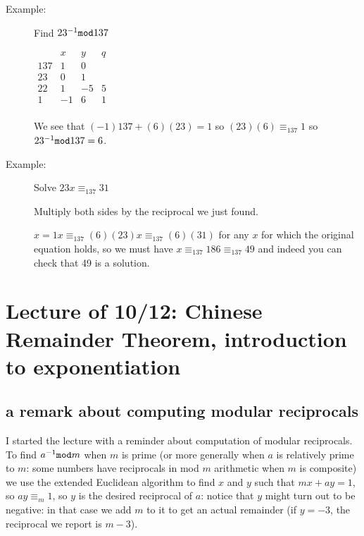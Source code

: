\documentclass[12pt]{article}
\begin{document}
\begin{description}


\item[Example:]  Find $23^{-1}{\tt mod}137$

$\begin{array}{cccc}
& x& y & q \\ \hline
137 & 1 & 0 & \\

23 & 0 & 1 & \\

22 & 1 & -5 & 5 \\

1 & -1 & 6 & 1 \\

\end{array}$

We see that $(-1)137 + (6)(23) = 1$ so $(23)(6) \equiv_{137} 1$ so $23^{-1} {\tt mod} 137 = 6$.

\item[Example:]  Solve $23x \equiv_{137} 31$

Multiply both sides by the reciprocal we just found.

$x = 1x \equiv_{137} (6)(23)x \equiv_{137} (6)(31)$ for any $x$ for which the original equation holds,
so we must have $x \equiv_{137} 186 \equiv_{137} 49$ and indeed you can check that 49 is a solution.

\end{description}

\section{Lecture of 10/12:  Chinese Remainder Theorem, introduction to exponentiation}

\subsection{a remark about computing modular reciprocals}

I started the lecture with a reminder about computation of modular reciprocals.  To find $a^{-1}{\tt mod}m$ when $m$ is prime (or more generally when $a$ is relatively prime to $m$:  some numbers have reciprocals in mod $m$ arithmetic when $m$ is composite) we use the extended Euclidean algorithm to find $x$ and $y$ such that $mx + ay = 1$, 
so $ay \equiv_m 1$, so $y$ is the desired reciprocal of $a$:  notice that $y$ might turn out to be negative:  in that case we add $m$ to it to get an actual remainder (if $y = -3$, the reciprocal we report is $m-3$).
\end{document}
